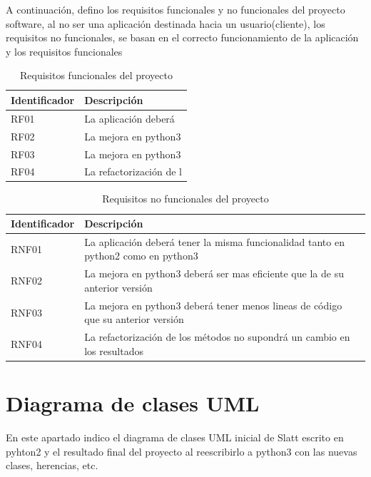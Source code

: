 \documentclass{cosas/tfg_domingo}
\begin{document}
A continuación, defino los requisitos funcionales y no funcionales del proyecto software, al no ser una aplicación destinada hacia un usuario(cliente), los requisitos no funcionales, se basan en el correcto funcionamiento de la aplicación y los requisitos funcionales

\begin{table}[h]
\centering
\begin{tabular}{|l|l|}
\hline
Identificador & Descripción                     \\ \hline
RF01         & La aplicación deberá            \\ \hline
RF02         & La mejora en python3            \\ \hline
RF03         & La mejora en python3            \\ \hline
RF04         & La refactorización de l         \\ \hline
\end{tabular}
\caption{Requisitos funcionales del proyecto}
\label{tab:my-table}
\end{table}

\begin{table}[h]
\centering
\begin{tabular}{|l|l|}
\hline
Identificador & Descripción                              \\ \hline
RNF01         & La aplicación deberá tener la misma funcionalidad tanto en python2 como en python3                                          \\ \hline
RNF02          & La mejora en python3 deberá ser mas eficiente que la de su anterior versión                                                  \\ \hline
RNF03          & La mejora en python3 deberá tener menos lineas de código que su anterior versión                                         \\ \hline
RNF04          & La refactorización de los métodos no supondrá un cambio en los resultados                                               \\ \hline
\end{tabular}
\caption{Requisitos no funcionales del proyecto}
\label{tab:my-table}
\end{table}

\newpage

\section{Diagrama de clases UML}
En este apartado indico el diagrama de clases UML inicial de Slatt escrito en pyhton2 y el resultado final del proyecto al reescribirlo a python3 con las nuevas clases, herencias, etc.
\end{document}
